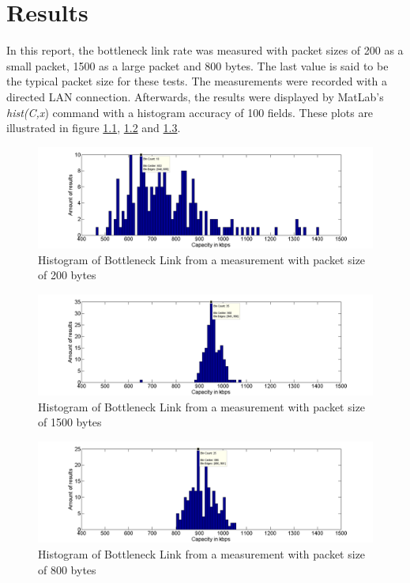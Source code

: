 
\chapter{\label{text:Kap3}Results}

In this report, the bottleneck link rate was measured with packet sizes of 200 as a small packet, 1500 as a large packet and 800 bytes. The last value is said to be the typical packet size for these tests. The measurements were recorded with a directed LAN connection. Afterwards, the results were displayed by MatLab's \textit{hist(C,x}) command with a histogram accuracy of 100 fields. These plots are illustrated in figure \ref{bild:200}, \ref{bild:1500} and \ref{bild:800}.

\begin{figure}[!ht]
\centering

\includegraphics[width=\textwidth]{bilder/histogram_packet_size_200C.png}
\caption{Histogram of Bottleneck Link from a measurement with packet size of 200 bytes}
\label{bild:200}
\end{figure}

\begin{figure}[!ht]
\centering
\includegraphics[width=\textwidth]{bilder/histogram_packet_size_1500C.png}
\caption{Histogram of Bottleneck Link from a measurement with packet size of 1500 bytes}
\label{bild:1500}
\end{figure}

\begin{figure}[!ht]
\centering
\includegraphics[width=\textwidth]{bilder/histogram_packet_size_800C.png}
\caption{Histogram of Bottleneck Link from a measurement with packet size of 800 bytes}
\label{bild:800}
\end{figure}

